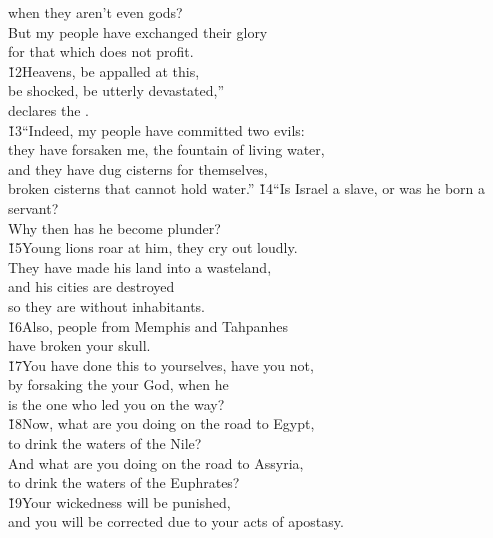 \begin{poetry}
\poemll    when they aren't even gods? \\
\poeml But my people have exchanged their glory \\
\poemll    for that which does not profit. \\
\poeml \v{12}Heavens, be appalled at this, \\
\poemll    be shocked, be utterly devastated,'' \\
\poemlll       declares the . \\
\poeml \v{13}``Indeed, my people have committed two evils: \\
\poemll    they have forsaken me, the fountain of living water, \\
\poeml and they have dug cisterns for themselves, \\
\poemll    broken cisterns that cannot hold water.''
\poeml \v{14}``Is Israel a slave, or was he born a servant? \\
\poemll    Why then has he become plunder? \\
\poeml \v{15}Young lions roar at him, they cry out loudly. \\
\poemll    They have made his land into a wasteland, \\
\poeml and his cities are destroyed \\
\poemll    so they are without inhabitants. \\
\poeml \v{16}Also, people from Memphis and Tahpanhes \\
\poemll    have broken your skull. \\
\poeml \v{17}You have done this to yourselves, have you not, \\
\poemll    by forsaking the  your God, when he \\
\poemlll       is the one who led you on the way? \\
\poeml \v{18}Now, what are you doing on the road to Egypt, \\
\poemll    to drink the waters of the Nile? \\
\poeml And what are you doing on the road to Assyria, \\
\poemll    to drink the waters of the Euphrates? \\
\poeml \v{19}Your wickedness will be punished, \\
\poemll    and you will be corrected due to your acts of apostasy. \\

\end{poetry}
